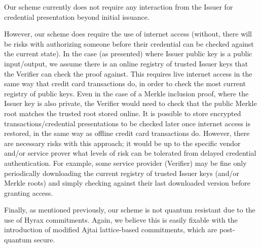 Our scheme currently does not require any interaction from the Issuer for credential presentation beyond initial issuance.

However, our scheme does require the use of internet access (without, there will be risks with authorizing someone before their credential can be checked against the current state).
In the case (as presented) where Issuer public key is a public input/output, we assume there is an online registry of trusted Issuer keys that the Verifier can check the proof against.
This requires live internet access in the same way that credit card transactions do, in order to check the most current registry of public keys. 
Even in the case of a Merkle inclusion proof, where the Issuer key is also private, the Verifier would need to check that the public Merkle root matches the trusted root stored online. 
It is possible to store encrypted transactions/credential presentations to be checked later once internet access is restored, in the same way as offline credit card transactions do. 
However, there are necessary risks with this approach; it would be up to the specific vendor and/or service prover what levels of risk can be tolerated from delayed credential authentication.
For example, some service provider (Verifier) may be fine only periodically downloading the current registry of trusted Issuer keys (and/or Merkle roots) and simply checking against their last downloaded version before granting access.


Finally, as mentioned previously, our scheme is not quantum resistant due to the use of Hyrax commitments. 
Again, we believe this is easily fixable with the introduction of modified Ajtai lattice-based commitments, which are post-quantum secure.
